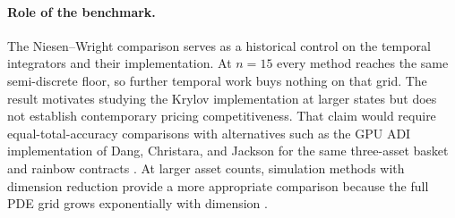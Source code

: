 \paragraph{Role of the benchmark.} The Niesen--Wright comparison serves as a historical control on the temporal integrators and their implementation. At $n=15$ every method reaches the same semi-discrete floor, so further temporal work buys nothing on that grid. The result motivates studying the Krylov implementation at larger states but does not establish contemporary pricing competitiveness. That claim would require equal-total-accuracy comparisons with alternatives such as the GPU ADI implementation of Dang, Christara, and Jackson for the same three-asset basket and rainbow contracts \cite{dang-christara-jackson-2010}. At larger asset counts, simulation methods with dimension reduction provide a more appropriate comparison because the full PDE grid grows exponentially with dimension \cite{wang-2009,weng-wang-he-2017}.

